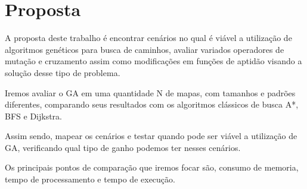 
\chapter[Proposta]{Proposta}

A proposta deste trabalho é encontrar cenários no qual é viável a utilização de algoritmos genéticos para busca de caminhos, avaliar variados operadores de mutação e cruzamento assim como modificações em funções de aptidão visando a solução desse tipo de problema.

Iremos avaliar o GA em uma quantidade N de mapas, com tamanhos e padrões diferentes, comparando seus resultados com os algoritmos clássicos de busca A*, BFS e Dijkstra. 

Assim sendo, mapear os cenários e testar quando pode ser viável a utilização de GA, verificando qual tipo de ganho podemos ter nesses cenários. 

Os principais pontos de comparação que iremos focar são, consumo de memoria, tempo de processamento e tempo de execução.  






